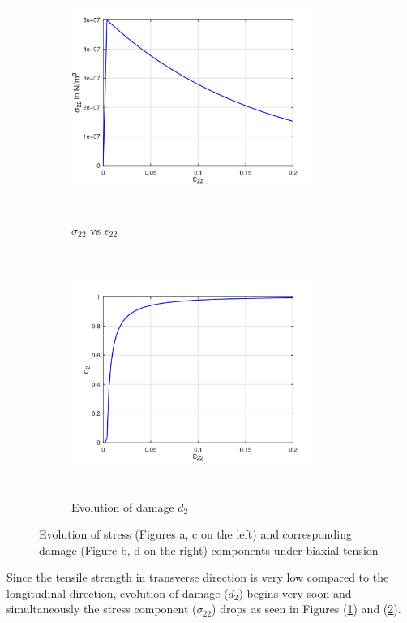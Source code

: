 \documentclass[12pt,a4paper,twoside,openright]{report}
\begin{document}
\FloatBarrier
\begin{figure}[htbp!]\ContinuedFloat 
     \begin{subfigure}{0.4\textwidth}
         \includegraphics[width=8cm,height=8cm,keepaspectratio]{23.S22vsE22.png}
         \caption{$\sigma_{22}$ vs $\epsilon_{22}$}
         \label{fig:S22vsE22}
     \end{subfigure}
     \hspace{1.8cm}
     \begin{subfigure}{0.4\textwidth}
         \centering
         \includegraphics[width=8cm,height=8cm,keepaspectratio]{23.d2.png}
         \caption{Evolution of damage $d_{2}$}
         \label{fig:Evolution of damage d2}
     \end{subfigure}
    
        \caption{Evolution of stress (Figures a, c on the left) and corresponding damage (Figure b, d on the right) components under biaxial tension}
        \label{fig:Evolution of damage under biaxial tension}     
\end{figure} 
\FloatBarrier
Since the tensile strength in transverse direction is very low compared to the longitudinal direction, evolution of damage ($d_{2}$) begins very soon and simultaneously the stress component ($\sigma_{22}$) drops as seen in Figures (\ref{fig:S22vsE22}) and (\ref{fig:Evolution of damage d2}).
\end{document}
